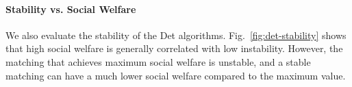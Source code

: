 
\paragraph{Stability vs. Social Welfare} We also evaluate the stability of the Det algorithms. Fig.~\ref{fig:det-stability} shows that high social welfare is generally correlated with low instability. However, the matching that achieves maximum social welfare is unstable, and a stable matching can have a much lower social welfare compared to the maximum value.
